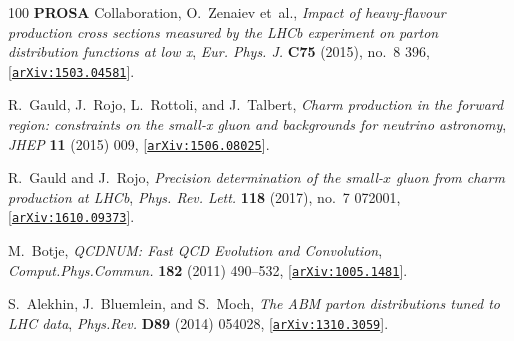 \begin{thebibliography}{100}
{\bf PROSA} Collaboration, O.~Zenaiev et~al., {\it {Impact of heavy-flavour
  production cross sections measured by the LHCb experiment on parton
  distribution functions at low x}},  {\em Eur. Phys. J.} {\bf C75} (2015),
  no.~8 396, [\href{http://arxiv.org/abs/1503.04581}{{\tt arXiv:1503.04581}}].

R.~Gauld, J.~Rojo, L.~Rottoli, and J.~Talbert, {\it {Charm production in the
  forward region: constraints on the small-x gluon and backgrounds for neutrino
  astronomy}},  {\em JHEP} {\bf 11} (2015) 009,
  [\href{http://arxiv.org/abs/1506.08025}{{\tt arXiv:1506.08025}}].

R.~Gauld and J.~Rojo, {\it {Precision determination of the small-$x$ gluon from
  charm production at LHCb}},  {\em Phys. Rev. Lett.} {\bf 118} (2017), no.~7
  072001, [\href{http://arxiv.org/abs/1610.09373}{{\tt arXiv:1610.09373}}].

M.~Botje, {\it {QCDNUM: Fast QCD Evolution and Convolution}},  {\em
  Comput.Phys.Commun.} {\bf 182} (2011) 490--532,
  [\href{http://arxiv.org/abs/1005.1481}{{\tt arXiv:1005.1481}}].

S.~Alekhin, J.~Bluemlein, and S.~Moch, {\it {The ABM parton distributions tuned
  to LHC data}},  {\em Phys.Rev.} {\bf D89} (2014) 054028,
  [\href{http://arxiv.org/abs/1310.3059}{{\tt arXiv:1310.3059}}].

\end{thebibliography}\endgroup


